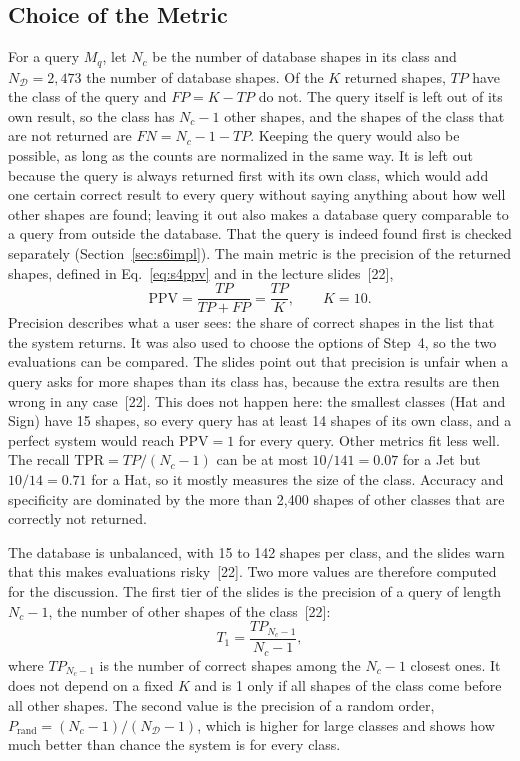 \documentclass[10pt,a4paper]{article}
\begin{document}
\subsection{Choice of the Metric}\label{sec:s6metric}
For a query $M_q$, let $N_c$ be the number of database shapes in its class and $N_{\mathcal{D}}=2{,}473$ the number of database
shapes. Of the $K$ returned shapes, $TP$ have the class of the query and $FP=K-TP$ do not. The query itself is left out of its
own result, so the class has $N_c-1$ other shapes, and the shapes of the class that are not returned are $FN=N_c-1-TP$. Keeping
the query would also be possible, as long as the counts are normalized in the same way. It is left out because the query is
always returned first with its own class, which would add one certain correct result to every query without saying anything
about how well other shapes are found; leaving it out also makes a database query comparable to a query from outside the
database. That the query is indeed found first is checked separately (Section~\ref{sec:s6impl}). The main
metric is the precision of the returned shapes, defined in Eq.~\eqref{eq:s4ppv} and in the lecture slides~[22],
\begin{equation}
\mathrm{PPV}=\frac{TP}{TP+FP}=\frac{TP}{K},\qquad K=10 .
\label{eq:s6ppv}
\end{equation}
Precision describes what a user sees: the share of correct shapes in the list that the system returns. It was also used to
choose the options of Step~4, so the two evaluations can be compared. The slides point out that precision is unfair when a query
asks for more shapes than its class has, because the extra results are then wrong in any case~[22]. This does not happen here:
the smallest classes (Hat and Sign) have 15 shapes, so every query has at least 14 shapes of its own class, and a perfect system
would reach $\mathrm{PPV}=1$ for every query. Other metrics fit less well. The recall $\mathrm{TPR}=TP/(N_c-1)$ can be at most
$10/141=0.07$ for a Jet but $10/14=0.71$ for a Hat, so it mostly measures the size of the class. Accuracy and specificity are
dominated by the more than 2,400 shapes of other classes that are correctly not returned.

The database is unbalanced, with 15 to 142 shapes per class, and the slides warn that this makes evaluations risky~[22]. Two
more values are therefore computed for the discussion. The first tier of the slides is the precision of a query of length
$N_c-1$, the number of other shapes of the class~[22]:
\begin{equation}
T_1=\frac{TP_{N_c-1}}{N_c-1},
\label{eq:s6tier}
\end{equation}
where $TP_{N_c-1}$ is the number of correct shapes among the $N_c-1$ closest ones. It does not depend on a fixed $K$ and is 1 only
if all shapes of the class come before all other shapes. The second value is the precision of a random order,
$P_{\mathrm{rand}}=(N_c-1)/(N_{\mathcal{D}}-1)$, which is higher for large classes and shows how much better than chance the system is
for every class.
\end{document}
